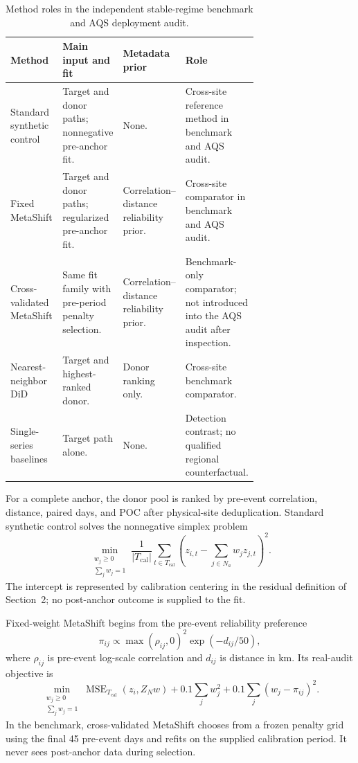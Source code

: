 \begin{table}[tbp]
\centering
\caption{Method roles in the independent stable-regime benchmark and AQS
deployment audit.}
\label{tab:method-roles}
\small
\begin{tabularx}{\linewidth}{@{}p{0.22\linewidth}p{0.24\linewidth}p{0.25\linewidth}X@{}}
\toprule
Method & Main input and fit & Metadata prior & Role \\
\midrule
Standard synthetic control & Target and donor paths; nonnegative pre-anchor
fit. & None. & Cross-site reference method in benchmark and AQS audit. \\
Fixed MetaShift & Target and donor paths; regularized pre-anchor fit. &
Correlation--distance reliability prior. & Cross-site comparator in benchmark
and AQS audit. \\
Cross-validated MetaShift & Same fit family with pre-period penalty selection. &
Correlation--distance reliability prior. & Benchmark-only comparator; not
introduced into the AQS audit after inspection. \\
Nearest-neighbor DiD & Target and highest-ranked donor. & Donor ranking only. &
Cross-site benchmark comparator. \\
Single-series baselines & Target path alone. & None. & Detection contrast; no
qualified regional counterfactual. \\
\bottomrule
\end{tabularx}
\end{table}

For a complete anchor, the donor pool is ranked by pre-event correlation,
distance, paired days, and POC after physical-site deduplication. Standard
synthetic control solves the nonnegative simplex problem
\[
  \min_{\substack{w_j\geq0\\\sum_jw_j=1}}
  \frac{1}{|T_{\mathrm{cal}}|}
  \sum_{t\in T_{\mathrm{cal}}}
  \left(z_{i,t}-\sum_{j\in N_a}w_jz_{j,t}\right)^2.
\]
The intercept is represented by calibration centering in the residual
definition of Section~2; no post-anchor outcome is supplied to the fit.

Fixed-weight MetaShift begins from the pre-event reliability preference
\[
  \pi_{ij}\propto
  \max(\rho_{ij},0)^2\exp(-d_{ij}/50),
\]
where $\rho_{ij}$ is pre-event log-scale correlation and $d_{ij}$ is distance
in km. Its real-audit objective is
\[
  \min_{\substack{w_j\geq0\\\sum_jw_j=1}}
  \operatorname{MSE}_{T_{\mathrm{cal}}}(z_i,Z_Nw)
  +0.1\sum_jw_j^2+0.1\sum_j(w_j-\pi_{ij})^2.
\]
In the benchmark, cross-validated MetaShift chooses from a frozen penalty grid
using the final 45 pre-event days and refits on the supplied calibration
period. It never sees post-anchor data during selection.

